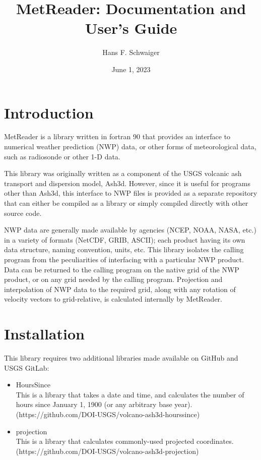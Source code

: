 \documentclass[11pt]{article}   %
\begin{document}
\title{MetReader: Documentation and User's Guide}   %
\author{Hans F. Schwaiger}
\date{June 1, 2023}    %
\maketitle

\section{Introduction}
MetReader is a library written in fortran 90 that provides an interface to
numerical weather prediction (NWP) data, or other forms of meteorological
data, such as radiosonde or other 1-D data.

This library was originally written as a component of the USGS volcanic ash
transport and dispersion model, Ash3d.  However, since it is useful for
programs other than Ash3d, this interface to NWP files is provided
as a separate repository that can either be compiled as a library or simply
compiled directly with other source code.

NWP data are generally made available by agencies (NCEP, NOAA, NASA, etc.)
in a variety of formats (NetCDF, GRIB, ASCII); each product having
its own data structure, naming convention, units, etc.  This library
isolates the calling program from the peculiarities of interfacing with
a particular NWP product.  Data can be returned to the calling program on
the native grid of the NWP product, or on any grid needed by the calling
program.  Projection and interpolation of NWP data to the required grid, along
with any rotation of velocity vectors to grid-relative, is calculated internally by
MetReader.

\section{Installation}
This library requires two additional libraries made available on GitHub and USGS GitLab:
\begin{itemize}
\item HoursSince \\
This is a library that takes a date and time, and calculates the number of hours
since January 1, 1900 (or any arbitrary base year).\\
(https://github.com/DOI-USGS/volcano-ash3d-hourssince)
\item projection \\
This is a library that calculates commonly-used projected coordinates.\\
(https://github.com/DOI-USGS/volcano-ash3d-projection)
\end{itemize}
\end{document}
